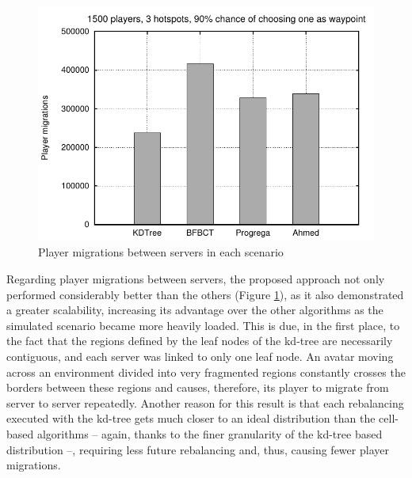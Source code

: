 \documentclass[acmjacm]{acmtrans2m}
\newcommand{\figurecaption}{Figure}
\begin{document}
\begin{figure}[!t]
	\includegraphics[width=0.49\linewidth]{data/1500players_prob90/migrations}
	\caption{Player migrations between servers in each scenario}
	\label{fig:migrations}
\end{figure}

Regarding player migrations between servers, the proposed approach not only performed considerably better than the others (\figurecaption{} \ref{fig:migrations}), as it also demonstrated a greater scalability, increasing its advantage over the other algorithms as the simulated scenario became more heavily loaded. This is due, in the first place, to the fact that the regions defined by the leaf nodes of the kd-tree are necessarily contiguous, and each server was linked to only one leaf node. An avatar moving across an environment divided into very fragmented regions constantly crosses the borders between these regions and causes, therefore, its player to migrate from server to server repeatedly. Another reason for this result is that each rebalancing executed with the kd-tree gets much closer to an ideal distribution than the cell-based algorithms -- again, thanks to the finer granularity of the kd-tree based distribution --, requiring less future rebalancing and, thus, causing fewer player migrations.
\end{document}
